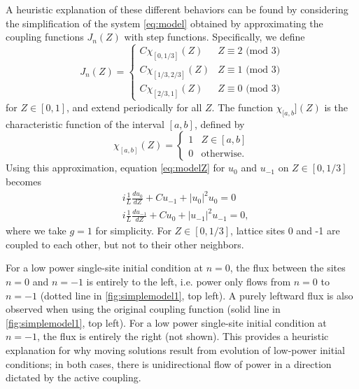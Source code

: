 \documentclass[reprint, amsmath,amssymb,aps,pre]{revtex4-2}
\begin{document}
A heuristic explanation of these different behaviors can be found by considering the simplification of the system \cref{eq:model} obtained by approximating the coupling functions $J_n(Z)$ with step functions. Specifically, we define
\begin{equation}\label{eq:simpleJn}
J_n(Z) = \begin{cases}
C\chi_{[0,1/3]}(Z) & Z \equiv 2 \text{ (mod 3)} \\
C\chi_{[1/3,2/3]}(Z) & Z \equiv 1 \text{ (mod 3)}\\
C\chi_{[2/3,1]}(Z) & Z \equiv 0 \text{ (mod 3)}
\end{cases}
\end{equation}
for $Z \in [0,1]$, and extend periodically for all $Z$. The function $\chi_{[a,b}](Z)$ is the characteristic function of the interval $[a,b]$, defined by
\[
\chi_{[a,b]}(Z) = \begin{cases}
1 & Z \in [a,b] \\
0 & \text{otherwise}.
\end{cases}
\]
Using this approximation, equation \cref{eq:modelZ} for $u_0$ and $u_{-1}$ on $Z \in [0,1/3]$ becomes
\begin{equation}\label{eq:approx2}
\begin{aligned}
&i \frac{1}{L} \frac{d u_0}{d Z} + C u_{-1} + |u_0|^2 u_0 = 0 \\
&i \frac{1}{L} \frac{d u_{-1}}{d Z} + C u_{0} + |u_{-1}|^2 u_{-1} = 0,
\end{aligned}
\end{equation}
where we take $g=1$ for simplicity. For $Z \in [0,1/3]$, lattice sites 0 and -1 are coupled to each other, but not to their other neighbors. 

For a low power single-site initial condition at $n=0$, the flux between the sites $n=0$ and $n=-1$ is entirely to the left, i.e. power only flows from $n=0$ to $n=-1$ (dotted line in \cref{fig:simplemodel1}, top left). A purely leftward flux is also observed when using the original coupling function (solid line in \cref{fig:simplemodel1}, top left).
For a low power single-site initial condition at $n=-1$, the flux is entirely the right (not shown).
This provides a heuristic explanation for why moving solutions result from evolution of low-power initial conditions; in both cases, there is unidirectional flow of power in a direction dictated by the active coupling.
\end{document}
